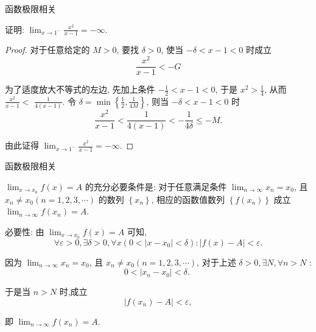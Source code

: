 \documentclass[
10pt,
aspectratio=43,
]{beamer}
\begin{document}
\begin{frame}{函数极限相关}
    \begin{block}{}
        证明: $\lim _{x \rightarrow 1^-} \frac{x^2}{x-1}=-\infty$.
    \end{block}
    \pause
    \begin{proof}
        对于任意给定的 $M>0$, 要找 $\delta>0$, 使当 $-\delta<x-1<0$ 时成立
        $$
            \frac{x^2}{x-1}<-G
        $$

        为了适度放大不等式的左边, 先加上条件 $-\frac{1}{2}<x-1<0$, 于是 $x^2>\frac{1}{4}$, 从而 $\frac{x^2}{x-1}<$ $\frac{1}{4(x-1)}$. 令 $\delta=\min \left\{\frac{1}{2}, \frac{1}{4 M}\right\}$, 则当 $-\delta<x-1<0$ 时
        $$
            \frac{x^2}{x-1}<\frac{1}{4(x-1)}<-\frac{1}{4 \delta} \leqslant-M .
        $$

        由此证得 $\lim _{x \rightarrow 1^-} \frac{x^2}{x-1}=-\infty$.
    \end{proof}
\end{frame}

\begin{frame}{函数极限相关}
    \begin{theorem}[Heine]
        $\lim _{x \rightarrow x_0} f(x)=A$ 的充分必要条件是: 对于任意满足条件 $\lim _{n \rightarrow \infty} x_n=x_0$, 且 $x_n \neq x_0(n=1,2,3, \cdots)$ 的数列 $\left\{x_n\right\}$, 相应的函数值数列 $\left\{f\left(x_n\right)\right\}$ 成立 $\lim _{n \rightarrow \infty} f\left(x_n\right)=A$.
    \end{theorem}
    \pause
    \begin{block}{}
        必要性: 由 $\lim _{x \rightarrow x_0} f(x)=A$ 可知,
        $$
            \forall \varepsilon>0, \exists \delta>0, \forall x\left(0<\left|x-x_0\right|<\delta\right):|f(x)-A|<\varepsilon .
        $$

        因为 $\lim _{n \rightarrow \infty} x_n=x_0$, 且 $x_n \neq x_0(n=1,2,3, \cdots)$, 对于上述 $\delta>0, \exists N, \forall n>N$ :
        $$
            0<\left|x_n-x_0\right|<\delta \text {. }
        $$

        于是当 $n>N$ 时,成立
        $$
            \left|f\left(x_n\right)-A\right|<\varepsilon,
        $$

        即 $\lim _{n \rightarrow \infty} f\left(x_n\right)=A$.
    \end{block}
\end{frame}
\end{document}
